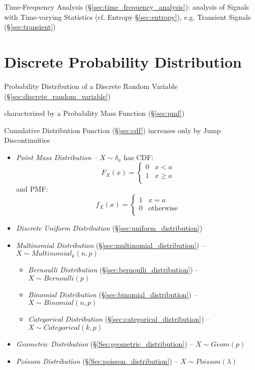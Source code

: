 \fist Time-Frequency Analysis (\S\ref{sec:time_frequency_analysis}): analysis
of Signals with Time-varying Statistics (cf. Entropy \S\ref{sec:entropy}), e.g.
Transient Signals (\S\ref{sec:transient})



\section{Discrete Probability Distribution}\label{sec:discrete_probability}

Probability Distribution of a Discrete Random Variable
(\S\ref{sec:discrete_random_variable})

characterized by a Probability Mass Function (\S\ref{sec:pmf})

Cumulative Distribution Function (\S\ref{sec:cdf}) increases only by Jump
Discontinuities

\begin{itemize}
  \item \emph{Point Mass Distribution} -- $X \sim \delta_a$ has CDF:
    \[
      F_X(x) = \begin{cases}
        0 & x <    a \\
        1 & x \geq a \\
      \end{cases}
    \]
    and PMF:
    \[
      f_X(x) = \begin{cases}
        1 & x = a \\
        0 & \text{otherwise} \\
      \end{cases}
    \]
  \item \emph{Discrete Uniform Distribution} (\S\ref{sec:uniform_distribution})
  \item \emph{Multinomial Distribution} (\S\ref{sec:multinomial_distribution})
    -- $X \sim Multinomial_k(n,p)$
  \begin{itemize}
    \item \emph{Bernoulli Distribution} (\S\ref{sec:bernoulli_distribution}) --
      $X \sim Bernoulli(p)$
    \item \emph{Binomial Distribution} (\S\ref{sec:binomial_distribution}) --
      $X \sim Binomial(n,p)$
    \item \emph{Categorical Distribution} (\S\ref{sec:categorical_distribution})
      -- $X \sim Categorical(k,p)$
  \end{itemize}
  \item \emph{Geometric Distribution} (\S\ref{Sec:geometric_distribution}) --
    $X \sim Geom(p)$
  \item \emph{Poisson Distribution} (\S\ref{Sec:poisson_distribution}) --
    $X \sim Poisson(\lambda)$
\end{itemize}



